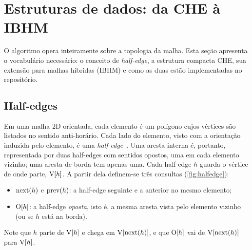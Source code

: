 \section{Estruturas de dados: da CHE à IBHM}
\label{sec:estruturas}

O algoritmo opera inteiramente sobre a topologia da malha. Esta seção apresenta o vocabulário necessário: o conceito
de \emph{half-edge}, a estrutura compacta CHE, sua extensão para malhas híbridas (IBHM) e como as duas estão
implementadas no repositório.

\subsection{Half-edges}

Em uma malha 2D orientada, cada elemento é um polígono cujos vértices são listados no sentido anti-horário. Cada lado
do elemento, visto com a orientação induzida pelo elemento, é uma \emph{half-edge}~\cite{mantyla}. Uma aresta interna
é, portanto, representada por duas half-edges com sentidos opostos, uma em cada elemento vizinho; uma aresta de borda
tem apenas uma. Cada half-edge $h$ guarda o vértice de onde parte, $\mathrm{V}[h]$. A partir dela definem-se três consultas
(\cref{fig:halfedge}):
\begin{itemize}
\item $\mathrm{next}(h)$ e $\mathrm{prev}(h)$: a half-edge seguinte e a anterior no mesmo elemento;
\item $\mathrm{O}[h]$: a half-edge \emph{oposta}, isto é, a mesma aresta vista pelo elemento vizinho (ou \BORDER{} se $h$
está na borda).
\end{itemize}
Note que $h$ parte de $\mathrm{V}[h]$ e chega em $\mathrm{V}[\mathrm{next}(h)]$, e que $\mathrm{O}[h]$ vai de $\mathrm{V}[\mathrm{next}(h)]$ para $\mathrm{V}[h]$.

